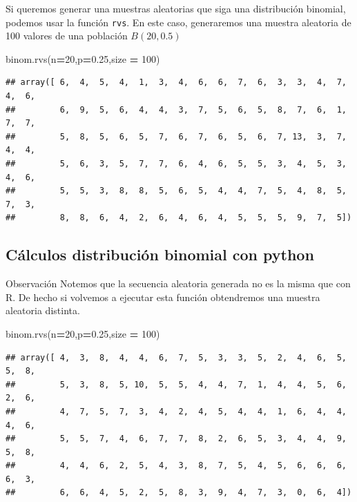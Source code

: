 \documentclass[]{book}
\newenvironment{Shaded}{\begin{snugshade}}{\end{snugshade}}
\newcommand{\DecValTok}[1]{\textcolor[rgb]{0.00,0.00,0.81}{#1}}
\newcommand{\FloatTok}[1]{\textcolor[rgb]{0.00,0.00,0.81}{#1}}
\newcommand{\NormalTok}[1]{#1}
\newcommand{\OperatorTok}[1]{\textcolor[rgb]{0.81,0.36,0.00}{\textbf{#1}}}
\begin{document}
Si queremos generar una muestras aleatorias que siga una distribución binomial, podemos usar la función \texttt{rvs}. En este caso, generaremos una muestra aleatoria de 100 valores de una población \(B(20,0.5)\)

\begin{Shaded}
\begin{Highlighting}[]
\NormalTok{binom.rvs(n}\OperatorTok{=}\DecValTok{20}\NormalTok{,p}\OperatorTok{=}\FloatTok{0.25}\NormalTok{,size }\OperatorTok{=} \DecValTok{100}\NormalTok{)}
\end{Highlighting}
\end{Shaded}

\begin{verbatim}
## array([ 6,  4,  5,  4,  1,  3,  4,  6,  6,  7,  6,  3,  3,  4,  7,  4,  6,
##         6,  9,  5,  6,  4,  4,  3,  7,  5,  6,  5,  8,  7,  6,  1,  7,  7,
##         5,  8,  5,  6,  5,  7,  6,  7,  6,  5,  6,  7, 13,  3,  7,  4,  4,
##         5,  6,  3,  5,  7,  7,  6,  4,  6,  5,  5,  3,  4,  5,  3,  4,  6,
##         5,  5,  3,  8,  8,  5,  6,  5,  4,  4,  7,  5,  4,  8,  5,  7,  3,
##         8,  8,  6,  4,  2,  6,  4,  6,  4,  5,  5,  5,  9,  7,  5])
\end{verbatim}

\hypertarget{cuxe1lculos-distribuciuxf3n-binomial-con-python-4}{%
\subsection{Cálculos distribución binomial con python}\label{cuxe1lculos-distribuciuxf3n-binomial-con-python-4}}

 Observación
Notemos que la secuencia aleatoria generada no es la misma que con R. De hecho si volvemos a ejecutar esta función obtendremos una muestra aleatoria distinta.

\begin{Shaded}
\begin{Highlighting}[]
\NormalTok{binom.rvs(n}\OperatorTok{=}\DecValTok{20}\NormalTok{,p}\OperatorTok{=}\FloatTok{0.25}\NormalTok{,size }\OperatorTok{=} \DecValTok{100}\NormalTok{)}
\end{Highlighting}
\end{Shaded}

\begin{verbatim}
## array([ 4,  3,  8,  4,  4,  6,  7,  5,  3,  3,  5,  2,  4,  6,  5,  5,  8,
##         5,  3,  8,  5, 10,  5,  5,  4,  4,  7,  1,  4,  4,  5,  6,  2,  6,
##         4,  7,  5,  7,  3,  4,  2,  4,  5,  4,  4,  1,  6,  4,  4,  4,  6,
##         5,  5,  7,  4,  6,  7,  7,  8,  2,  6,  5,  3,  4,  4,  9,  5,  8,
##         4,  4,  6,  2,  5,  4,  3,  8,  7,  5,  4,  5,  6,  6,  6,  6,  3,
##         6,  6,  4,  5,  2,  5,  8,  3,  9,  4,  7,  3,  0,  6,  4])
\end{verbatim}
\end{document}
